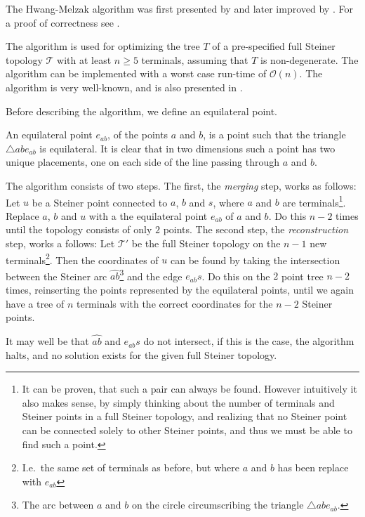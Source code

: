 The Hwang-Melzak algorithm was first presented by \textcite{melzak1961} and
later improved by \textcite{hwang1986hexagonal}. For a proof of correctness see
\textcite{hwang1986linear, melzak1961}.

The algorithm is used for optimizing the tree $T$ of a pre-specified full
Steiner topology $\mathcal{T}$ with at least $n \ge 5$ terminals, assuming that
$T$ is non-degenerate. The algorithm can be implemented with a worst case
run-time of $\mathcal{O}(n)$. The algorithm is very well-known, and is also
presented in \textcite{brazil2015,smith1992}.

Before describing the algorithm, we define an equilateral point.
%
\begin{definition}
  An equilateral point $e_{ab}$, of the points $a$ and $b$, is a point such that the
  triangle $\triangle a b e_{ab}$ is equilateral. It is clear that in two dimensions
  such a point has two unique placements, one on each side of the line passing
  through $a$ and $b$.
\end{definition}
%
The algorithm consists of two steps. The first, the \textit{merging} step, works
as follows: Let $u$ be a Steiner point connected to $a$, $b$ and $s$, where $a$
and $b$ are terminals\footnote{It can be proven, that such a pair can always be
  found. However intuitively it also makes sense, by simply thinking about the
  number of terminals and Steiner points in a full Steiner topology, and realizing
  that no Steiner point can be connected solely to other Steiner points, and thus
  we must be able to find such a point.}. Replace $a$, $b$ and $u$ with a the
equilateral point $e_{ab}$ of $a$ and $b$. Do this $n-2$ times until the
topology consists of only $2$ points. The second step, the
\textit{reconstruction} step, works a follows: Let $\mathcal{T}'$ be the full
Steiner topology on the $n-1$ new terminals\footnote{I.e.\ the same set of
  terminals as before, but where $a$ and $b$ has been replace with
  $e_{ab}$}. Then the coordinates of $u$ can be found by taking the intersection
between the Steiner arc $\widehat{ab}$\footnote{The arc between $a$ and $b$ on the
  circle circumscribing the triangle $\triangle a b e_{ab}$.} and the edge
$e_{ab}s$. Do this on the $2$ point tree $n-2$ times, reinserting the points
represented by the equilateral points, until we again have a tree of $n$
terminals with the correct coordinates for the $n-2$ Steiner points.

It may well be that $\widehat{ab}$ and $e_{ab}s$ do not intersect, if this is
the case, the algorithm halts, and no solution exists for the given full
Steiner topology.

